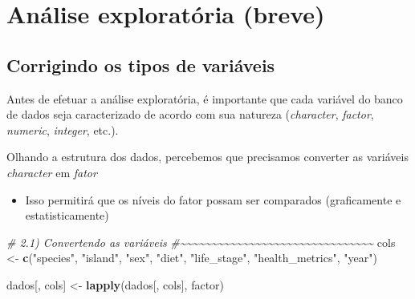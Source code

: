 \documentclass[
]{book}
\newenvironment{Shaded}{\begin{snugshade}}{\end{snugshade}}
\newcommand{\CommentTok}[1]{\textcolor[rgb]{0.56,0.35,0.01}{\textit{#1}}}
\newcommand{\FunctionTok}[1]{\textcolor[rgb]{0.13,0.29,0.53}{\textbf{#1}}}
\newcommand{\NormalTok}[1]{#1}
\newcommand{\OtherTok}[1]{\textcolor[rgb]{0.56,0.35,0.01}{#1}}
\newcommand{\StringTok}[1]{\textcolor[rgb]{0.31,0.60,0.02}{#1}}
\providecommand{\tightlist}{%
  \setlength{\itemsep}{0pt}\setlength{\parskip}{0pt}}
\begin{document}
\section{Análise exploratória (breve)}\label{anuxe1lise-exploratuxf3ria-breve}

\subsection{Corrigindo os tipos de variáveis}\label{corrigindo-os-tipos-de-variuxe1veis}

Antes de efetuar a análise exploratória, é importante que cada variável do banco de dados seja caracterizado de acordo com sua natureza (\emph{character}, \emph{factor}, \emph{numeric}, \emph{integer}, etc.).

Olhando a estrutura dos dados, percebemos que precisamos converter as variáveis \emph{character} em \emph{fator}

\begin{itemize}
\tightlist
\item
  Isso permitirá que os níveis do fator possam ser comparados (graficamente e estatisticamente)
\end{itemize}

\begin{Shaded}
\begin{Highlighting}[]
\CommentTok{\# 2.1) Convertendo as variáveis}
\CommentTok{\#\textasciitilde{}\textasciitilde{}\textasciitilde{}\textasciitilde{}\textasciitilde{}\textasciitilde{}\textasciitilde{}\textasciitilde{}\textasciitilde{}\textasciitilde{}\textasciitilde{}\textasciitilde{}\textasciitilde{}\textasciitilde{}\textasciitilde{}\textasciitilde{}\textasciitilde{}\textasciitilde{}\textasciitilde{}\textasciitilde{}\textasciitilde{}\textasciitilde{}\textasciitilde{}\textasciitilde{}\textasciitilde{}\textasciitilde{}\textasciitilde{}\textasciitilde{}\textasciitilde{}\textasciitilde{}\textasciitilde{}}
\NormalTok{cols }\OtherTok{\textless{}{-}} \FunctionTok{c}\NormalTok{(}\StringTok{"species"}\NormalTok{, }\StringTok{"island"}\NormalTok{, }\StringTok{"sex"}\NormalTok{, }\StringTok{"diet"}\NormalTok{, }\StringTok{"life\_stage"}\NormalTok{, }\StringTok{"health\_metrics"}\NormalTok{, }\StringTok{"year"}\NormalTok{)}

\NormalTok{dados[, cols] }\OtherTok{\textless{}{-}} \FunctionTok{lapply}\NormalTok{(dados[, cols], factor)}
\end{Highlighting}
\end{Shaded}
\end{document}
